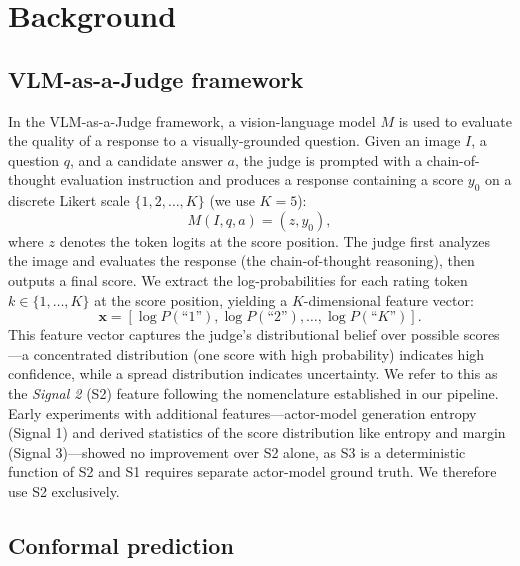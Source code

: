 \documentclass{article}
\begin{document}
\section{Background}
\label{sec:background}

\subsection{VLM-as-a-Judge framework}
\label{sec:vlm_judge}

In the VLM-as-a-Judge framework, a vision-language model $M$ is used to evaluate the quality of a response to a visually-grounded question. Given an image $I$, a question $q$, and a candidate answer $a$, the judge is prompted with a chain-of-thought evaluation instruction and produces a response containing a score $y_0$ on a discrete Likert scale $\{1, 2, \ldots, K\}$ (we use $K=5$):
\begin{equation}
M(I, q, a) = (z, y_0),
\end{equation}
where $z$ denotes the token logits at the score position. The judge first analyzes the image and evaluates the response (the chain-of-thought reasoning), then outputs a final score. We extract the log-probabilities for each rating token $k \in \{1, \ldots, K\}$ at the score position, yielding a $K$-dimensional feature vector:
\begin{equation}
\mathbf{x} = [\log P(\text{``1''}), \log P(\text{``2''}), \ldots, \log P(\text{``$K$''})].
\label{eq:features}
\end{equation}
This feature vector captures the judge's distributional belief over possible scores---a concentrated distribution (one score with high probability) indicates high confidence, while a spread distribution indicates uncertainty. We refer to this as the \emph{Signal 2} (S2) feature following the nomenclature established in our pipeline. Early experiments with additional features---actor-model generation entropy (Signal 1) and derived statistics of the score distribution like entropy and margin (Signal 3)---showed no improvement over S2 alone, as S3 is a deterministic function of S2 and S1 requires separate actor-model ground truth. We therefore use S2 exclusively.

\subsection{Conformal prediction}
\label{sec:cp}
\end{document}
